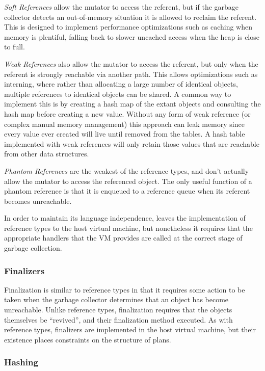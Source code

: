 \emph{Soft References} allow the mutator to access the referent, but if the
garbage collector detects an out-of-memory situation it is allowed to reclaim
the referent.  This is designed to implement performance optimizations such as 
caching when memory is plentiful, falling back to slower uncached access when 
the heap is close to full.

\emph{Weak References} also allow the mutator to access the referent, but only
when the referent is strongly reachable via another path.  This allows optimizations
such as {interning}, where rather than allocating a large number of identical 
objects, multiple references to identical objects can be shared.  A common way to
implement this is by creating a hash map of the extant objects and consulting the
hash map before creating a new value.  Without any form of weak reference (or
complex manual memory management) this approach can leak memory since every value
ever created will live until removed from the tables.  A hash table implemented
with weak references will only retain those values that are reachable from 
other data structures.

\emph{Phantom References} are the weakest of the reference types, and don't actually
allow the mutator to access the referenced object.  The only useful function of a
phantom reference is that it is enqueued to a reference queue when its referent
becomes unreachable.

In order to maintain its language independence, \mmtk leaves the implementation of
reference types to the host virtual machine, but nonetheless it requires that the
appropriate handlers that the VM provides are called at the correct stage of 
garbage collection.

\subsubsection{Finalizers}

Finalization is similar to reference types in that it requires some action to
be taken when the garbage collector determines that an object has become 
unreachable.  Unlike reference types, finalization requires that the objects themselves
be ``revived'', and their finalization method executed.  As with reference types,
finalizers are implemented in the host virtual machine, but their existence places
constraints on the structure of \mmtk plans.

\subsubsection{Hashing}

